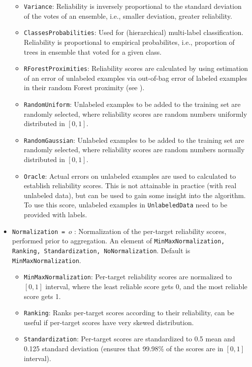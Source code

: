 \begin{itemize}
	\begin{itemize}
		\item {\tt Variance}: Reliability is inversely proportional to the standard deviation of the votes of an ensemble, i.e., smaller deviation, greater reliability.
		\item {\tt ClassesProbabilities}: Used for (hierarchical) multi-label classification. Reliability is proportional to empirical probabilites, i.e., proportion of trees in ensemble that voted for a given class.
		\item {\tt RForestProximities}: Reliability scores are calculated by using estimation of an error of unlabeled examples via out-of-bag error of labeled examples in their random Forest proximity (see \cite{levatic2017_self-training}).
		\item {\tt RandomUniform}: Unlabeled examples to be added to the training set are randomly selected, where reliability scores are random numbers uniformly distributed in $[0,1]$.
		\item {\tt RandomGaussian}: Unlabeled examples to be added to the training set are randomly selected, where reliability scores are random numbers normally distributed in $[0,1]$.
		\item {\tt Oracle}: Actual errors on unlabeled examples are used to calculated to establish reliability scores. This is not attainable in practice (with real unlabeled data), but can be used to gain some insight into the algorithm. To use this score, unlabeled examples in {\tt UnlabeledData} need to be provided with labels.
	\end{itemize}
	\item {\tt Normalization = $o$} : Normalization of the per-target reliability scores, performed prior to aggregation. An element of {\tt MinMaxNormalization, Ranking, Standardization, NoNormalization}. Default is {\tt MinMaxNormalization}.
	\begin{itemize}
		\item {\tt MinMaxNormalization}: Per-target reliability scores are normalized to $[0,1]$ interval, where the least reliable score gets 0, and the most reliable score gets 1.
		\item {\tt Ranking}: Ranks per-target scores according to their reliability, can be useful if per-target scores have very skewed distribution.
		\item {\tt Standardization}: Per-target scores are standardized to 0.5 mean and 0.125 standard deviation (ensures that 99.98\% of the scores are in $[0,1]$ interval).

\end{itemize}
\end{itemize}
